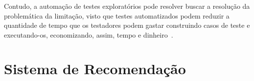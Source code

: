 Contudo, a automação de testes exploratórios pode resolver buscar a resolução da problemática da limitação, visto que testes 
automatizados podem reduzir a quantidade de tempo que os testadores podem gastar construindo casos de teste e executando-os, 
economizando, assim, tempo e dinheiro~\cite{dustin2009implementing}. 


\section{Sistema de Recomendação}
